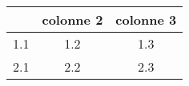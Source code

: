 ﻿




\begin{tabular}{|c|c|c|}

\hline
 & colonne 2 & colonne 3 \\
\hline
1.1 & 1.2 & 1.3 \\
2.1 & 2.2 & 2.3 \\
\hline

\end{tabular}